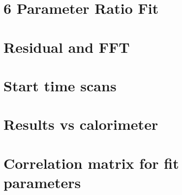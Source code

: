 \section{6 Parameter Ratio Fit}


\section{Residual and FFT}




\section{Start time scans}


\section{Results vs calorimeter}



\section{Correlation matrix for fit parameters}



